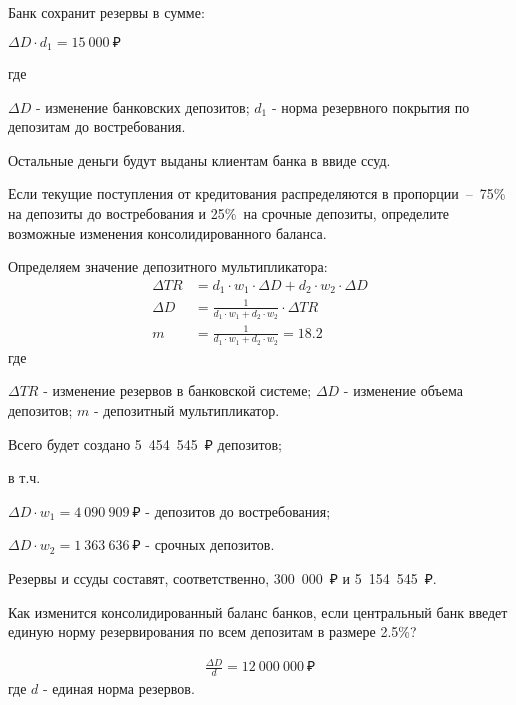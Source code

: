 \documentclass[12pt, table]{exam}
\begin{document}
\begin{questions}
\begin{subparts}
	\begin{solution}[12em]
		Банк сохранит резервы в сумме:
		
		$\Delta D \cdot d_1 = 15~000~₽$
		
		где 
		
		$\Delta D$ - изменение банковских депозитов; $d_1$ - норма резервного покрытия по депозитам до востребования.
		
		Остальные деньги будут выданы клиентам банка в ввиде ссуд.
		
	\end{solution}
	
	\subpart[10]  Если текущие поступления от кредитования распределяются в пропорции – 75\% на депозиты до востребования и 25\% на срочные депозиты, определите возможные изменения консолидированного баланса.
	
	\begin{solution}[12em]
		Определяем значение депозитного мультипликатора:
		\begin{align*}
		\Delta TR&= d_1 \cdot w_1 \cdot \Delta D + d_2 \cdot w_2 \cdot \Delta D\\
		\Delta D&=\frac{1}{d_1 \cdot w_1 +d_2 \cdot w_2}\cdot \Delta TR\\
		m&= \frac{1}{d_1 \cdot w_1 +d_2 \cdot w_2} = 18.2
		\end{align*}
		где
		
		$\Delta TR$ - изменение резервов в банковской системе;	$\Delta D$ - изменение объема депозитов; $m$ - депозитный мультипликатор.
		
		Всего будет создано 5~454~545~₽ депозитов;
		
		в т.ч.
		
		$\Delta D \cdot w_1= 4~090~909~₽$ - депозитов до востребования;
		
		$\Delta D \cdot w_2= 1~363~636~₽$ - срочных депозитов.
		
		Резервы и ссуды составят, соответственно, 300~000~₽ и 5~154~545~₽.
		
		
	\end{solution}
	
	\subpart[3] Как изменится консолидированный баланс банков, если центральный банк введет единую норму резервирования по всем депозитам в размере 2.5\%?
	\begin{solution}[12em]
		\begin{align*}
		\frac{\Delta D }{d}=12~000~000~₽
		\end{align*}
		где $d$ - единая норма резервов.
		

\end{solution}
\end{subparts}
\end{questions}
\end{document}
